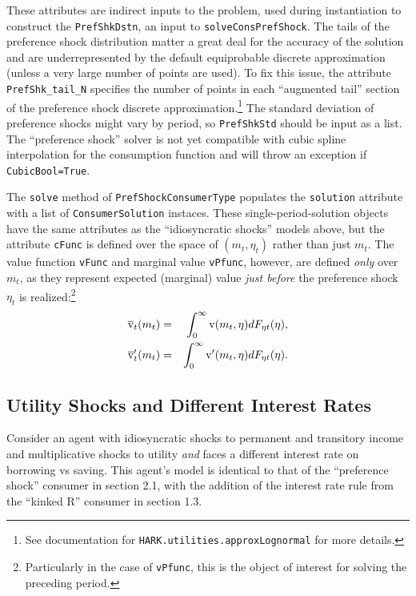 \documentclass[12pt,titlepage,letterpaper]{econtex}
\begin{document}
These attributes are indirect inputs to the problem, used during instantiation to construct the \texttt{PrefShkDstn}, an input to \texttt{solveConsPrefShock}.  The tails of the preference shock distribution matter a great deal for the accuracy of the solution and are underrepresented by the default equiprobable discrete approximation (unless a very large number of points are used).  To fix this issue, the attribute \texttt{PrefShk\_tail\_N} specifies the number of points in each ``augmented tail'' section of the preference shock discrete approximation.\footnote{See documentation for \texttt{HARK.utilities.approxLognormal} for more details.}  The standard deviation of preference shocks might vary by period, so \texttt{PrefShkStd} should be input as a list.  The ``preference shock'' solver is not yet compatible with cubic spline interpolation for the consumption function and will throw an exception if \texttt{CubicBool=True}.

The \texttt{solve} method of \texttt{PrefShockConsumerType} populates the \texttt{solution} attribute with a list of \texttt{ConsumerSolution} instaces.  These single-period-solution objects have the same attributes as the ``idiosyncratic shocks'' models above, but the attribute \texttt{cFunc} is defined over the space of $(m_t,\eta_t)$ rather than just $m_t$.  The value function \texttt{vFunc} and marginal value \texttt{vPfunc}, however, are defined \textit{only} over $m_t$, as they represent expected (marginal) value \textit{just before} the preference shock $\eta_t$ is realized:\footnote{Particularly in the case of \texttt{vPfunc}, this is the object of interest for solving the preceding period.}
\begin{eqnarray*}
\overline{\mathrm{v}}_t(m_t) &=& \int_0^\infty \mathrm{v}(m_t,\eta)dF_{\eta t}(\eta), \\
\overline{\mathrm{v}}_t'(m_t) &=& \int_0^\infty \mathrm{v}'(m_t,\eta)dF_{\eta t}(\eta).
\end{eqnarray*}


\subsection{Utility Shocks and Different Interest Rates}

Consider an agent with idiosyncratic shocks to permanent and transitory income and multiplicative shocks to utility \textit{and} faces a different interest rate on borrowing vs saving.  This agent's model is identical to that of the ``preference shock'' consumer in section 2.1, with the addition of the interest rate rule from the ``kinked R'' consumer in section 1.3.
\end{document}
